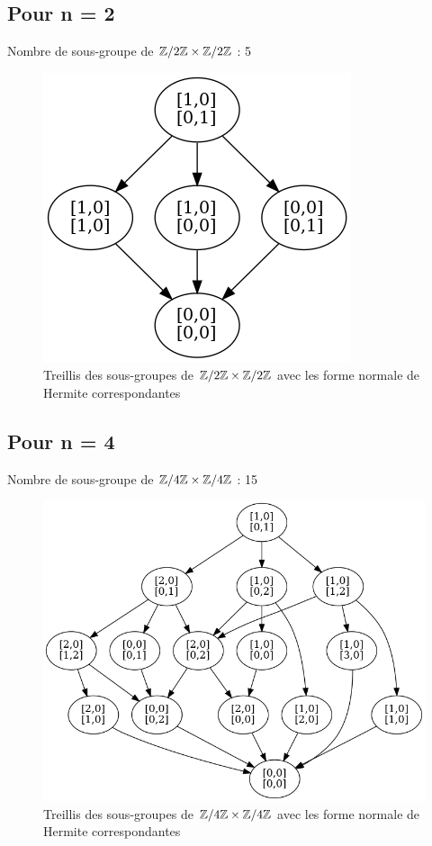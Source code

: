 \documentclass[12pt]{article}
\begin{document}
\subsection{Pour n = 2}
\noindent
Nombre de sous-groupe de $\mathbb Z/2\mathbb Z \times \mathbb Z/2\mathbb Z$ : 5
\begin{figure}[!h]
	\centering
	\includegraphics[scale=0.4]{Z2ZxZ2Z.png}
	\caption{
		Treillis des sous-groupes de $\mathbb Z/2\mathbb Z \times \mathbb Z/2\mathbb Z$ avec les forme normale de Hermite
		correspondantes
	}
\end{figure}
\subsection{Pour n = 4}
\noindent
Nombre de sous-groupe de $\mathbb Z/4\mathbb Z \times \mathbb Z/4\mathbb Z$ : 15
\begin{figure}[!h]
	\centering
	\includegraphics[scale=0.4]{Z4ZxZ4Z.png}
	\caption{
		Treillis des sous-groupes de $\mathbb Z/4\mathbb Z \times \mathbb Z/4\mathbb Z$ avec les forme normale de Hermite
		correspondantes
	}
\end{figure}
\newpage
\end{document}
